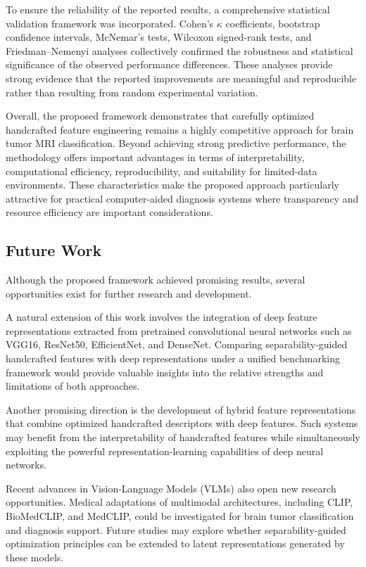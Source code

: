 To ensure the reliability of the reported results, a comprehensive statistical
validation framework was incorporated. Cohen's $\kappa$ coefficients, bootstrap
confidence intervals, McNemar's tests, Wilcoxon signed-rank tests, and
Friedman--Nemenyi analyses collectively confirmed the robustness and statistical
significance of the observed performance differences. These analyses provide strong
evidence that the reported improvements are meaningful and reproducible rather than
resulting from random experimental variation.

Overall, the proposed framework demonstrates that carefully optimized handcrafted
feature engineering remains a highly competitive approach for brain tumor MRI
classification. Beyond achieving strong predictive performance, the methodology
offers important advantages in terms of interpretability, computational efficiency,
reproducibility, and suitability for limited-data environments. These characteristics
make the proposed approach particularly attractive for practical computer-aided
diagnosis systems where transparency and resource efficiency are important
considerations.

\subsection{Future Work}
\label{sec:concl_future}

Although the proposed framework achieved promising results, several opportunities
exist for further research and development.

A natural extension of this work involves the integration of deep feature
representations extracted from pretrained convolutional neural networks such as
VGG16, ResNet50, EfficientNet, and DenseNet. Comparing separability-guided
handcrafted features with deep representations under a unified benchmarking
framework would provide valuable insights into the relative strengths and
limitations of both approaches.

Another promising direction is the development of hybrid feature representations
that combine optimized handcrafted descriptors with deep features. Such systems may
benefit from the interpretability of handcrafted features while simultaneously
exploiting the powerful representation-learning capabilities of deep neural
networks.

Recent advances in Vision-Language Models (VLMs) also open new research
opportunities. Medical adaptations of multimodal architectures, including CLIP,
BioMedCLIP, and MedCLIP, could be investigated for brain tumor classification and
diagnosis support. Future studies may explore whether separability-guided
optimization principles can be extended to latent representations generated by
these models.

